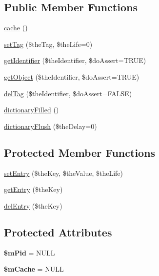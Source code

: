 \subsection*{Public Member Functions}
\begin{DoxyCompactItemize}
\item 
\hyperlink{class_ontology_wrapper_1_1_dictionary_object_afc377ae7487d9f7004f0f790121b9f76}{cache} ()
\item 
\hyperlink{class_ontology_wrapper_1_1_dictionary_object_a34c06436a94921b47885505cfd5efffe}{set\-Tag} (\$the\-Tag, \$the\-Life=0)
\item 
\hyperlink{class_ontology_wrapper_1_1_dictionary_object_a9e86ec29b5523074af3244888789e64e}{get\-Identifier} (\$the\-Identifier, \$do\-Assert=T\-R\-U\-E)
\item 
\hyperlink{class_ontology_wrapper_1_1_dictionary_object_a10ca50e087c2d9b4ff6da952088e9195}{get\-Object} (\$the\-Identifier, \$do\-Assert=T\-R\-U\-E)
\item 
\hyperlink{class_ontology_wrapper_1_1_dictionary_object_a263aeb948e7668950fc9aa90be459558}{del\-Tag} (\$the\-Identifier, \$do\-Assert=F\-A\-L\-S\-E)
\item 
\hyperlink{class_ontology_wrapper_1_1_dictionary_object_ab2ae4af97de01b93c8c89fdfe6a2cfad}{dictionary\-Filled} ()
\item 
\hyperlink{class_ontology_wrapper_1_1_dictionary_object_a8f3fa4a572053a970eda952c9f76ae3b}{dictionary\-Flush} (\$the\-Delay=0)
\end{DoxyCompactItemize}
\subsection*{Protected Member Functions}
\begin{DoxyCompactItemize}
\item 
\hyperlink{class_ontology_wrapper_1_1_dictionary_object_a29d05a749afc71b7a09702f6bc7a8f17}{set\-Entry} (\$the\-Key, \$the\-Value, \$the\-Life)
\item 
\hyperlink{class_ontology_wrapper_1_1_dictionary_object_ab6c1db9ac69974aa12940468bb1e95c4}{get\-Entry} (\$the\-Key)
\item 
\hyperlink{class_ontology_wrapper_1_1_dictionary_object_a2af5d68ce5b9187dbc6963f71de4274a}{del\-Entry} (\$the\-Key)
\end{DoxyCompactItemize}
\subsection*{Protected Attributes}
\begin{DoxyCompactItemize}
\item 
\hypertarget{class_ontology_wrapper_1_1_dictionary_object_afcd8452895d2b22850c042465a1228fc}{{\bfseries \$m\-Pid} = N\-U\-L\-L}\label{class_ontology_wrapper_1_1_dictionary_object_afcd8452895d2b22850c042465a1228fc}

\item 
\hypertarget{class_ontology_wrapper_1_1_dictionary_object_ad57b4dc0623434edf61cfd7660a26b8c}{{\bfseries \$m\-Cache} = N\-U\-L\-L}\label{class_ontology_wrapper_1_1_dictionary_object_ad57b4dc0623434edf61cfd7660a26b8c}

\end{DoxyCompactItemize}
